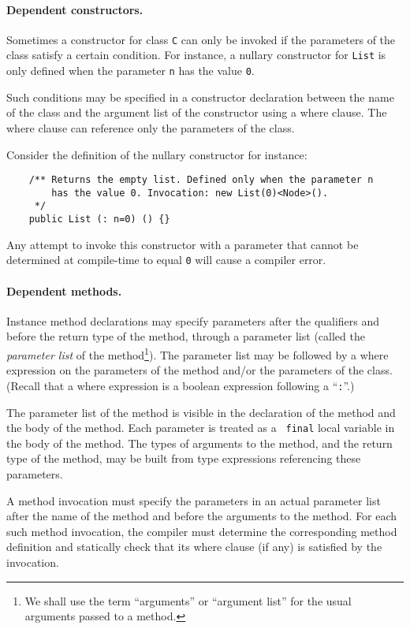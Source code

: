 \documentclass{article}
\begin{document}
{}\paragraph{Dependent constructors.} Sometimes a constructor for
class {\tt C} can only be invoked if the parameters of the class
satisfy a certain condition. For instance, a nullary constructor for
{\tt List} is only defined when the parameter {\tt n} has the value
{\tt 0}.

Such conditions may be specified in a constructor declaration between
the name of the class and the argument list of the constructor using a
where clause. The where clause can reference only the parameters of
the class.


Consider the definition of the nullary constructor for instance:
{\footnotesize
\begin{verbatim}
    /** Returns the empty list. Defined only when the parameter n 
        has the value 0. Invocation: new List(0)<Node>().
     */
    public List (: n=0) () {}
\end{verbatim}}

Any attempt to invoke this constructor with a parameter that cannot be
determined at compile-time to equal {\tt 0} will cause a compiler
error.

{}\paragraph{Dependent methods.}  
Instance method declarations may specify parameters after the
qualifiers and before the return type of the method, through a
parameter list (called the {\em parameter list} of the
method\footnote{We shall use the term ``arguments'' or ``argument
list'' for the usual arguments passed to a method.}).  The parameter
list may be followed by a where expression on the parameters of the
method and/or the parameters of the class. (Recall that a where
expression is a boolean expression following a ``{\tt :}''.)

The parameter list of the method is visible in the declaration of the
method and the body of the method. Each parameter is treated as a {\tt
final} local variable in the body of the method.  The types of
arguments to the method, and the return type of the method, may be
built from type expressions referencing these parameters.

A method invocation must specify the parameters in an actual parameter
list after the name of the method and before the arguments to the
method.  For each such method invocation, the compiler must determine the
corresponding method definition and statically check that its where
clause (if any) is satisfied by the invocation.
\end{document}
